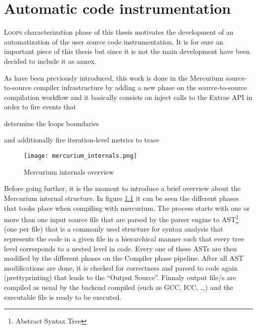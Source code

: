 \chapter{Automatic code instrumentation}\label{ann:automatic_code_instr}

\lettrine{L}{oops} characterization phase of this thesis motivates the development
of an automatization of the user source code instrumentation. It is for sure an
important piece of this thesis but since it is not the main development have been
decided to include it as annex.

As have been previously introduced, this work is done in the Mercurium 
source-to-source compiler infrastructure by adding a new phase on the 
source-to-source compilation workflow and it basically consists on inject 
calls to the Extrae API in order to fire events that
\begin{enumerate*}[label=\roman*)]
    \item determine the loops boundaries 
    \item and additionally fire iteration-level metrics to trace
\end{enumerate*}

\begin{figure}
  \centering
  \texttt{[image: mercurium\_internals.png]}
  \caption{Mercurium internals overview}
  \label{fig:mercurium_internals_overview}
\end{figure}

Before going further, it is the moment to introduce a brief overview about the
Mercurium internal structure. In figure \ref{fig:mercurium_internals_overview} 
it can be seen the different phases that tooks place when compiling with
mercurium. The process starts with one or more than one input source file that
are parsed by the parser engine to AST\footnote{Abstract Syntax Tree} (one per
file) that is a commonly used structure for syntax analysis that represents the 
code in a given file in a hierarchical manner such that every tree level
corresponds to a nested level in code. Every one of these ASTs are then modified
by the different phases on the Compiler phase pipeline. 
After all AST modifications are done, it is checked for
correctness and parsed to code again (prettyprinting) that leads to the ``Output
Source''. Finnaly output file/s are compiled as usual by the backend compiled
(such as GCC, ICC, \ldots) and the executable file is ready to be executed.

